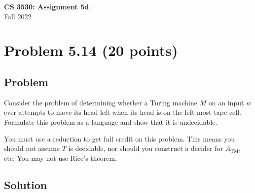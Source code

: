 \documentclass{article}
\begin{document}
\begin{center}
\textbf{\Large CS 3530: Assignment 5d} \\[2mm]
Fall 2022
\end{center}

\raggedright

\section*{Problem 5.14 (20 points)}

\subsection*{Problem}

Consider the problem of determining whether a Turing machine $M$ on
an input $w$ ever attempts to move its head left when its head is on
the left-most tape cell. Formulate this problem as a language and
show that it is undecidable.

You must use a reduction to get full credit on this problem. This
means you should not assume $T$ is decidable, nor should you
construct a decider for $A_\text{TM}$, etc. You may not use Rice's
theorem.

\subsection*{Solution}
\end{document}
